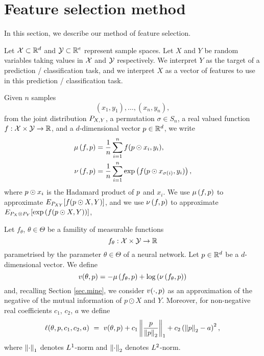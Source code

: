 \section{Feature selection method}
\label{sec.method}


In this section,
we describe
our method of feature selection.

Let 
$\spaceX \subset \Rd$
and 
$\spaceY \subset \R^{e}$
represent sample spaces.
Let 
$X$
and 
$Y$
be random variables taking values in 
$\spaceX$
and 
$\spaceY$
respectively.
We interpret $Y$ as 
the target of a
prediction / classification
task,
and
we interpret $X$ as
a vector of features to use in this
prediction / classification
task.

Given $n$ samples
\begin{equation*}
	(x_1, y_1), 
	\dots,
	(x_n, y_n), 
\end{equation*}
from the joint distribution $\Prob_{X, Y}$, 
a permutation $\sigma \in S_n$,
a real valued function $f: \spaceX \times \spaceY \rightarrow \R$,
and
a $d$-dimensional vector $\projection \in \Rd$,
we write
\begin{equation}
	\begin{split}
		\jointeval[f, \projection] &= \frac{1}{n} \sum_{i=1}^{n} f(\projection \hadamard x_i, y_i),
		\\
		\prodeval[f, \projection] &= \frac{1}{n} \sum_{i=1}^{n} \exp\left(f(\projection \hadamard x_{\sigma(i)}, y_i)\right),
	\end{split}
\end{equation}
where
$\projection \hadamard x_i$ 
is the Hadamard product of 
$\projection$ and $x_i$. 
We use 
$\jointeval[f, \projection]$ 
to approximate 
$\Expectation_{\Prob_{XY}}[f(\projection \hadamard X, Y)]$,
and we use
$\prodeval[f, \projection]$ 
to approximate 
$\Expectation_{\Prob_{X} \otimes \Prob_{Y}}[\exp\left(f(\projection \hadamard X, Y)\right)]$,

Let 
$f_\theta$, $\theta \in \Theta$
be a famility of measurable functions
\begin{equation*}
	f_\theta: \spaceX \times \spaceY \rightarrow \R
\end{equation*}
parametrised by the parameter $\theta \in \Theta$ of a neural network.
Let 
$\projection \in \Rd$
be a $d$-dimensional vector. 
We define
\begin{equation}
	\donskervaradhanloss(\theta, \projection) = - \jointeval[f_\theta, \projection] + \log \left(\prodeval[f_\theta, \projection]\right)
\end{equation}
and, recalling Section \ref{sec.mine},
we consider 
$\donskervaradhanloss ( \cdot, p)$ 
as an approximation of the negative of the mutual information of $p \odot X$ and $Y$. 
Moreover, 
for 
non-negative real coefficients $c_1$, $c_2$, $a$
we define
\begin{equation}
	\lossfun(\theta, p, c_1, c_2, a)
 \,\,
	=  
 \,\,
	\donskervaradhanloss(\theta, \projection)
		 + 
		c_1 \lonenorm[\frac{\projection}{\ltwonorm[\projection]}]
		 + 
		c_2 \left( \ltwonorm[\projection] - a \right)\squared,
\end{equation}
where 
$\lonenorm$ denotes $\Lone$-norm 
and 
$\ltwonorm$ denotes $\Ltwo$-norm.

